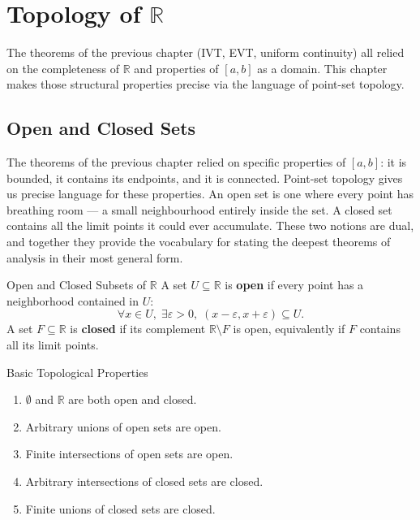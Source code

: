 \documentclass[12pt, openany]{book}
\theoremstyle{plain}
\theoremstyle{definition}
\theoremstyle{remark}
\newcommand{\R}{\mathbb{R}}
\newcommand{\eps}{\varepsilon}
\begin{document}
\chapter{Topology of \texorpdfstring{$\R$}{R}}
\color{black}

The theorems of the previous chapter (IVT, EVT, uniform continuity) all relied on the completeness of $\R$ and properties of $[a,b]$ as a domain. This chapter makes those structural properties precise via the language of point-set topology.

\section{Open and Closed Sets}

The theorems of the previous chapter relied on specific properties of $[a,b]$: it is bounded, it contains its endpoints, and it is connected.  Point-set topology gives us precise language for these properties.  An open set is one where every point has breathing room --- a small neighbourhood entirely inside the set.  A closed set contains all the limit points it could ever accumulate.  These two notions are dual, and together they provide the vocabulary for stating the deepest theorems of analysis in their most general form.

\begin{defbox}{Open and Closed Subsets of $\R$}
A set $U \subseteq \R$ is \textbf{open} if every point has a neighborhood contained in $U$:
\[ \forall x \in U,\; \exists \eps > 0,\; (x - \eps, x + \eps) \subseteq U. \]
A set $F \subseteq \R$ is \textbf{closed} if its complement $\R \setminus F$ is open, equivalently if $F$ contains all its limit points.
\end{defbox}
\color{black}

\begin{propbox}{Basic Topological Properties}
\begin{enumerate}[noitemsep]
  \item $\emptyset$ and $\R$ are both open and closed.
  \item Arbitrary unions of open sets are open.
  \item Finite intersections of open sets are open.
  \item Arbitrary intersections of closed sets are closed.
  \item Finite unions of closed sets are closed.
\end{enumerate}
\end{propbox}
\color{black}
\end{document}
